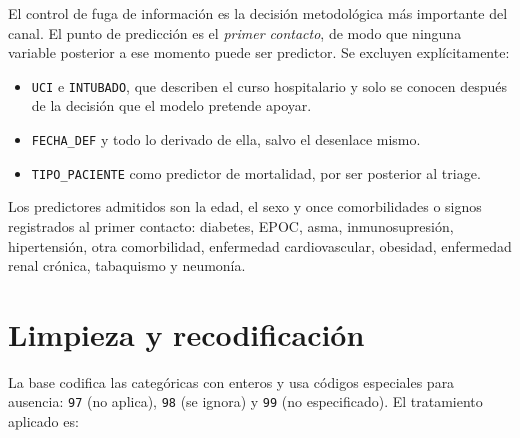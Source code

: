 El control de fuga de información es la decisión metodológica más importante del
canal. El punto de predicción es el \emph{primer contacto}, de modo que ninguna variable
posterior a ese momento puede ser predictor. Se excluyen explícitamente:

\begin{itemize}[leftmargin=*]
  \item \texttt{UCI} e \texttt{INTUBADO}, que describen el curso hospitalario y
    solo se conocen después de la decisión que el modelo pretende apoyar.
  \item \texttt{FECHA\_DEF} y todo lo derivado de ella, salvo el desenlace mismo.
  \item \texttt{TIPO\_PACIENTE} como predictor de mortalidad, por ser posterior
    al triage.
\end{itemize}

Los predictores admitidos son la edad, el sexo y once comorbilidades o signos
registrados al primer contacto: diabetes, EPOC, asma, inmunosupresión,
hipertensión, otra comorbilidad, enfermedad cardiovascular, obesidad, enfermedad
renal crónica, tabaquismo y neumonía.


\section{Limpieza y recodificación}

La base codifica las categóricas con enteros y usa códigos especiales para
ausencia: \texttt{97} (no aplica), \texttt{98} (se ignora) y \texttt{99} (no
especificado). El tratamiento aplicado es:

